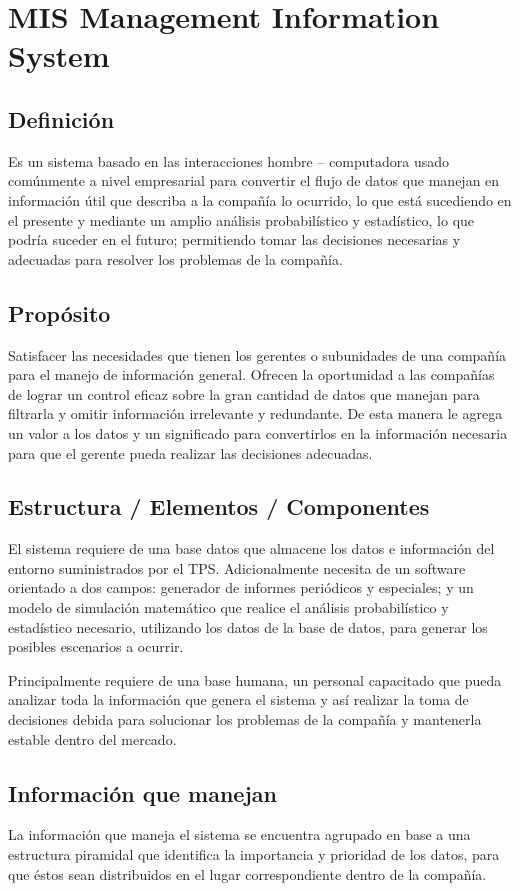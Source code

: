 \chapter[MIS]{MIS Management Information System}
\section {Definición}
Es un sistema basado en las interacciones hombre – computadora usado comúnmente a nivel empresarial para convertir el flujo de datos que manejan en información útil que describa a la compañía lo ocurrido, lo que está sucediendo en el presente y mediante un amplio análisis probabilístico y estadístico, lo que podría suceder en el futuro; permitiendo tomar las decisiones necesarias y adecuadas para resolver los problemas de la compañía.
\section {Propósito}
Satisfacer las necesidades que tienen los gerentes o subunidades de una compañía para el manejo de información general. Ofrecen la oportunidad a las compañías de lograr un control eficaz sobre la gran cantidad de datos que manejan para filtrarla y omitir información irrelevante y redundante. De esta manera le agrega un valor a los datos y un significado para convertirlos en la información necesaria para que el gerente pueda realizar las decisiones adecuadas.
\section {Estructura / Elementos / Componentes}
El sistema requiere de una base datos que almacene los datos e información del entorno suministrados por el TPS. Adicionalmente necesita de un software orientado a dos campos: generador de informes periódicos y especiales; y un modelo de simulación matemático que realice el análisis probabilístico y estadístico necesario, utilizando los datos de la base de datos, para generar los posibles escenarios a ocurrir.

Principalmente requiere de una base humana, un personal capacitado que pueda analizar toda la información que genera el sistema y así realizar la toma de decisiones debida para solucionar los problemas de la compañía y mantenerla estable dentro del mercado.
\section {Información que manejan}
La información que maneja el sistema se encuentra agrupado en base a  una estructura piramidal que identifica la importancia y prioridad de los datos, para que éstos sean distribuidos en el lugar correspondiente dentro de la compañía.

